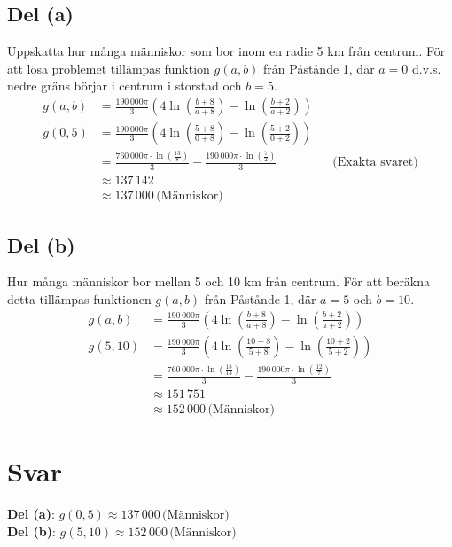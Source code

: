 \documentclass{article}
\begin{document}
\subsection*{Del (a)}
Uppskatta hur många människor som bor inom en radie 5 km från centrum.
För att lösa problemet tillämpas funktion \( g(a,b) \) från Påstånde 1, där \( a
= 0 \) d.v.s. nedre gräns börjar i centrum i storstad och \( b = 5 \).  
\begin{align*}
	g(a,b) &= \frac{190\,000 \pi}{3}
		\left(4\ln{\left(\frac{b + 8}{a + 8}\right)} 
		- \ln{\left(\frac{b + 2}{a + 2}\right)} \right)
		\\ 
	g(0,5) &= \frac{190\,000\pi}{3} \left(4\ln{\left(\frac{5 + 8}{0 + 8}\right)} 
		- \ln{\left(\frac{5 + 2}{0 + 2}\right)}\right) \\
	       &= \frac{760\,000\pi \cdot \ln{\left(\frac{13}{8}\right)}}{3} 
	       - \frac{190\,000\pi \cdot \ln{\left(\frac{7}{2}\right)}}{3} 
	       &&\text{(Exakta svaret)} \\
	       &\approx 137\,142 \\
	       &\approx 137\,000 \, \text{(Människor)}
\end{align*}

\subsection*{Del (b)}
Hur många människor bor mellan 5 och 10 km från centrum. För att beräkna detta
tillämpas funktionen \( g(a,b) \) från Påstånde 1, där \( a = 5 \) och \( b =
10 \).
\begin{align*}
	g(a,b) &= \frac{190\,000 \pi}{3}
		\left(4\ln{\left(\frac{b + 8}{a + 8}\right)} 
		- \ln{\left(\frac{b + 2}{a + 2}\right)} \right)
		\\ 
	g(5,10) &= \frac{190\,000\pi}{3} \left(4\ln{\left(\frac{10 + 8}{5 + 8}\right)} 
		- \ln{\left(\frac{10 + 2}{5 + 2}\right)}\right) \\
	       &= \frac{760\,000\pi \cdot \ln{\left(\frac{18}{13}\right)}}{3} 
	       - \frac{190\,000\pi \cdot \ln{\left(\frac{12}{7}\right)}}{3} \\
	       &\approx 151\,751 \\ 
	       &\approx 152\,000 \, \text{(Människor)}
\end{align*}

\section*{Svar}
\textbf{Del (a)}: $g(0, 5) \approx 137\,000 \, \text{(Människor)}$ \\
\textbf{Del (b)}: $g(5, 10) \approx 152\,000 \, \text{(Människor)}$
\end{document}
